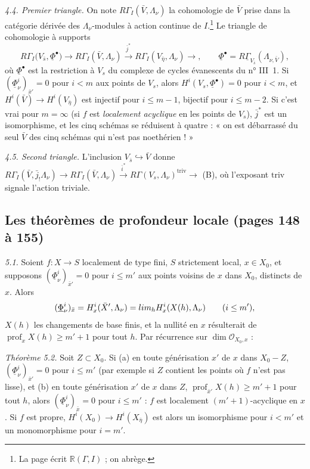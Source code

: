 \documentclass[11pt,a4paper]{article}
\begin{document}
\emph{4.4. Premier triangle.} On note $R\Gamma_I(\bar V, \Lambda_\nu)$ la
cohomologie de $\bar V$ prise dans la catégorie dérivée des
$\Lambda_\nu$-modules à action continue de $I$.\footnote{La page écrit
$\mathbb{R}(\Gamma, I)$ ; on abrège.} Le triangle de cohomologie à supports
\[
  R\Gamma_I\bigl(V_{\bar s}, \underline\Phi^\bullet\bigr) \to R\Gamma_I(\bar V, \Lambda_\nu)
  \xrightarrow{\ \bar j^*\ } R\Gamma_I(V_{\bar\eta}, \Lambda_\nu) \to , \qquad
  \underline\Phi^\bullet = R\underline\Gamma_{V_{\bar s}}(\Lambda_{\nu, \bar V}), \tag{A}
\]
où $\underline\Phi^\bullet$ est la restriction à $V_s$ du complexe de cycles
évanescents du n° III~1. Si $(\underline\Phi^i_\nu)_{\bar x'} = 0$ pour $i < m$
aux points de $V_s$, alors $H^i(V_s, \underline\Phi^\bullet) = 0$ pour $i < m$, et
$H^i(\bar V) \to H^i(V_{\bar\eta})$ est injectif pour $i \leq m - 1$, bijectif
pour $i \leq m - 2$. Si c'est vrai pour $m = \infty$ (si $f$ est
\emph{localement acyclique} en les points de $V_s$), $\bar j^*$ est un
isomorphisme, et les cinq schémas se réduisent à quatre : « on est débarrassé du
seul $\bar V$ des cinq schémas qui n'est pas noethérien ! »

\emph{4.5. Second triangle.} L'inclusion $V_{\bar s} \hookrightarrow \bar V$ donne
$R\Gamma_I(\bar V, \bar j_!\Lambda_\nu) \to R\Gamma_I(\bar V, \Lambda_\nu)
\xrightarrow{\bar i^*} R\Gamma(V_s, \Lambda_\nu)^{\mathrm{triv}} \to$ (B), où
l'exposant $\mathrm{triv}$ signale l'action triviale.

\subsection*{Les théorèmes de profondeur locale (pages 148 à 155)}

\emph{5.1.} Soient $f : X \to S$ localement de type fini, $S$ strictement local,
$x \in X_0$, et supposons $(\underline\Phi^i_\nu)_{\bar x'} = 0$ pour $i \leq m'$
aux points voisins de $x$ dans $X_0$, distincts de $x$. Alors
\[
  (\underline\Phi^i_\nu)_{\bar x} = H^i_x(\bar X', \Lambda_\nu)
  = \varinjlim_h H^i_x(X(h), \Lambda_\nu) \qquad (i \leq m'),
\]
$X(h)$ les changements de base finis, et la nullité en $x$ résulterait de
$\operatorname{prof}_x X(h) \geq m' + 1$ pour tout $h$. Par récurrence sur
$\dim \mathcal{O}_{X_0,x}$ :

\emph{Théorème 5.2.} Soit $Z \subset X_0$. Si (a) en toute générisation $x'$ de
$x$ dans $X_0 - Z$, $(\underline\Phi^i_\nu)_{\bar x'} = 0$ pour $i \leq m'$ (par
exemple si $Z$ contient les points où $f$ n'est pas lisse), et (b) en toute
générisation $x'$ de $x$ dans $Z$, $\operatorname{prof}_{\bar x'} X(h) \geq m'+1$
pour tout $h$, alors $(\underline\Phi^i_\nu)_{\bar x} = 0$ pour $i \leq m'$ : $f$
est localement $(m'+1)$-acyclique en $x$. Si $f$ est propre,
$H^i(X_0) \to H^i(X_{\bar\eta})$ est alors un isomorphisme pour $i < m'$ et un
monomorphisme pour $i = m'$.
\end{document}
